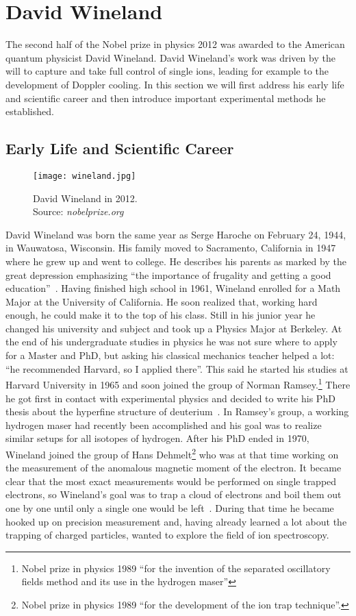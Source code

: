 \section{David Wineland}
\label{sec:Wineland}
The second half of the Nobel prize in physics 2012 was awarded to the American
quantum physicist David Wineland. David Wineland's work was driven by the will to
capture and take full control of single ions, leading for example to the
development of Doppler cooling. In this section we will first address
his early life and scientific career and then introduce important experimental
methods he established.

\subsection{Early Life and Scientific Career}
\begin{wrapfigure}{r}{0.34\textwidth}
  \centering
  \texttt{[image: wineland.jpg]}
  \caption{David Wineland in 2012.\\ Source: \textit{nobelprize.org}}
\end{wrapfigure}
David Wineland was born the same year as Serge Haroche on February 24, 1944,
in Wauwatosa, Wisconsin. His family moved to Sacramento, California in 1947
where he grew up and went to college. He describes his parents as marked by the
great depression emphasizing ``the importance of frugality and getting a good
education''~\cite{dwbio}. Having finished high school in 1961, Wineland enrolled
for a Math Major at the University of California. He soon realized that, working
hard enough, he could make it to the top of his class. Still in his junior year
he changed his university and subject and took up a Physics Major at Berkeley.
At the end of his undergraduate studies in physics he was not sure where to apply
for a Master and PhD, but asking his classical mechanics teacher helped a lot:
``he recommended Harvard, so I applied there''. This said he started his studies
at Harvard University in 1965 and soon joined the group of Norman Ramsey.\footnote{Nobel
prize in physics 1989 ``for the invention of the separated oscillatory fields
method and its use in the hydrogen maser''} 
There he got first in contact with experimental physics and decided to write his
PhD thesis about the hyperfine structure of deuterium~\cite{wineland1972atomic}.
In Ramsey's group, a working 
hydrogen maser had recently been accomplished and his goal was to realize similar
setups for all isotopes of hydrogen. After his PhD ended in  1970, Wineland
joined the group of Hans Dehmelt\footnote{Nobel prize in physics 1989 ``for the
development of the ion trap technique''.} who was at that time working on the
measurement of the anomalous magnetic moment of the electron. It became clear
that the most exact measurements would be performed on single trapped electrons,
so Wineland's goal was to trap a cloud of electrons and boil them out one by one
until only a single one would be left~\cite{wineland1973monoelectron}. During
that time he became hooked up on precision measurement and, having already
learned a lot about the trapping of charged particles, wanted to explore the
field of ion spectroscopy.

